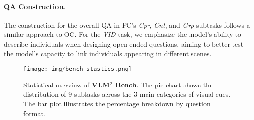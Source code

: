 \paragraph{QA Construction.} The construction for the overall QA in PC’s \textit{Cpr}, \textit{Cnt}, and \textit{Grp} subtasks follows a similar approach to OC. For the \textit{VID} task, we emphasize the model's ability to describe individuals when designing open-ended questions, aiming to better test the model's capacity to link individuals appearing in different scenes.

\begin{figure}[hb]
  \centering
  \texttt{[image: img/bench-stastics.png]} 
  \caption{Statistical overview of \textbf{VLM$^2$-Bench}. The pie chart shows the distribution of 9 subtasks across the 3 main categories of visual cues. The bar plot illustrates the percentage breakdown by question format. 
  }
  \label{fig:bench statistics main}
\end{figure}

